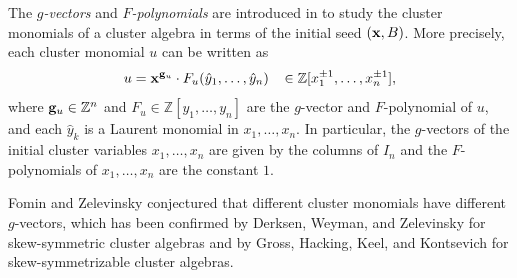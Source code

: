 \documentclass[10pt]{amsart}
\theoremstyle{definition}
\theoremstyle{remark}
\numberwithin{equation}{section}
\begin{document}
The {\em $g$-vectors} and {\em $F$-polynomials} are introduced in \cite{fomin_zelevinsky_2007} to study the cluster monomials of a cluster algebra in terms of the initial seed $({\bf x}, B)$. More precisely, each cluster monomial $u$ can be written as 
\[u={\bf x}^{{\bf g}_u}\cdot F_u(\hat y_1,\ldots,\hat y_n)\;\;\;\in\mathbb Z[x_1^{\pm 1},\ldots,x_{n}^{\pm 1}],
\]
where ${\bf g}_u\in\mathbb Z^n$ and $F_u\in\mathbb Z[y_1,\ldots,y_n]$ are the $g$-vector and $F$-polynomial of $u$, and  each $\hat y_k$ is a Laurent monomial in $x_1,\ldots,x_n$. In particular, the $g$-vectors of the initial cluster variables $x_1,\ldots,x_n$ are given by the columns of $I_n$ and the $F$-polynomials of $x_1,\ldots,x_n$ are the constant $1$. 

Fomin and Zelevinsky \cite{fomin_zelevinsky_2007} conjectured that different cluster monomials have different $g$-vectors, which has been confirmed by Derksen, Weyman, and Zelevinsky \cite{DWZ10} for skew-symmetric cluster algebras and by 
 Gross,  Hacking,  Keel, and Kontsevich for skew-symmetrizable cluster algebras.
\end{document}
